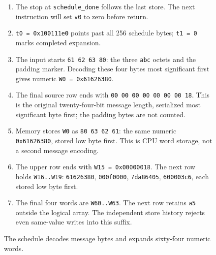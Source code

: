\begin{figure}[htbp]
  \par\smallskip
  \begin{minipage}{\linewidth}
    \small
    \begin{enumerate}
      \setlength{\itemsep}{0pt}
            \setlength{\parsep}{0pt}
      \item The stop at \texttt{schedule\_done} follows the last store. The next instruction will set \texttt{v0} to zero before return.
      \item \texttt{t0 = 0x100111e0} points past all 256 schedule bytes; \texttt{t1 = 0} marks completed expansion.
      \item The input starts \texttt{61 62 63 80}: the three \texttt{abc} octets and the padding marker. Decoding these four bytes most significant first gives numeric \texttt{W0 = 0x61626380}.
      \item The final source row ends with \texttt{00 00 00 00 00 00 00 18}. This is the original twenty-four-bit message length, serialized most significant byte first; the padding bytes are not counted.
      \item Memory stores \texttt{W0} as \texttt{80 63 62 61}: the same numeric \texttt{0x61626380}, stored low byte first. This is CPU word storage, not a second message encoding.
      \item The upper row ends with \texttt{W15 = 0x00000018}. The next row holds \texttt{W16..W19}: \texttt{61626380}, \texttt{000f0000}, \texttt{7da86405}, \texttt{600003c6}, each stored low byte first.
      \item The final four words are \texttt{W60..W63}. The next row retains \texttt{a5} outside the logical array. The independent store history rejects even same-value writes into this suffix.
    \end{enumerate}
  \end{minipage}
  \caption{The schedule decodes message bytes and expands sixty-four numeric words.}
  \label{capture:025-sha256-f01}
  \label{sha-f01}
\end{figure}
\par
